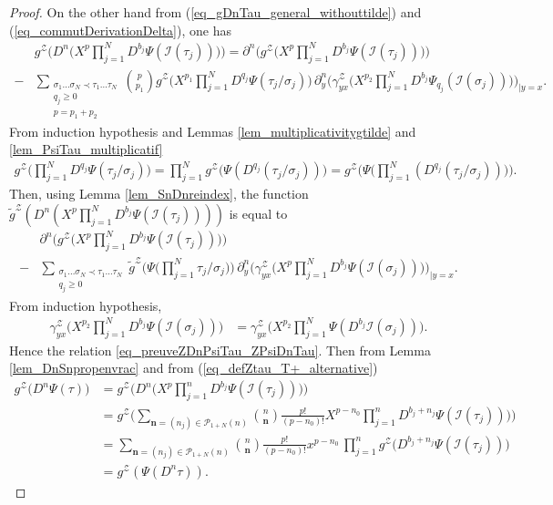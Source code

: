 \documentclass[11pt]{preprint}
\newcommand{\mcI}{\mathcal{I}}
\newcommand{\mcP}{\mathcal{P}}
\newcommand{\mcZ}{\mathcal{Z}}
\def\eqref#1{(\ref{#1})}
\begin{document}
\begin{proof}
On the other hand from \eqref{eq_gDnTau_general_withouttilde} and  \eqref{eq_commutDerivationDelta}, one has
\begin{align*}
&	{ g}^\mcZ \Big( D^n \Big( X^p \prod_{j=1}^{N} D^{b_j} \Psi( \mcI(\tau_j) )   \Big)    \Big) 
=  \partial^{n}\Big( {g}^\mcZ \Big(  X^p \prod_{j=1}^{N} D^{b_j} \Psi( \mcI(\tau_j) )   \Big) \Big)
	\\ -  &\sum_{\substack{\sigma_1\dots\sigma_N\prec\tau_1\dots\tau_N \\ q_j \geq 0 \\ p=p_1+p_2}} \binom{p}{p_1} { g}^\mcZ\Big(X^{p_1}\prod_{j=1}^{N} D^{q_j}\Psi(\tau_j/\sigma_j)\Big)
	\,
	 \partial^n_y \Big({\gamma^\mcZ_{yx}} \Big(X^{p_2}\prod_{j=1}^N D^{b_j}\Psi_{q_j}(\mcI(\sigma_j))\Big)\Big)_{|y=x}.
\end{align*}
From induction hypothesis and Lemmas \ref{lem_multiplicativitygtilde} and \ref{lem_PsiTau_multiplicatif}
\begin{align*}
	{ g}^\mcZ\Big(\prod_{j=1}^{N} D^{q_j}\Psi(\tau_j/\sigma_j)\Big) 
	=
	\prod_{j=1}^{N} { g}^\mcZ\Big( \Psi\left(D^{q_j}(\tau_j/\sigma_j)\right)\Big)
	 =
	  { g}^\mcZ\Big(\Psi\Big(\prod_{j=1}^{N} \left(D^{q_j}(\tau_j/\sigma_j)\right)\Big)\Big).
\end{align*}
Then, using Lemma \ref{lem_SnDnreindex}, the function $	\widetilde{ g}^\mcZ \left( D^n \left( X^p \prod_{j=1}^{N} D^{b_j} \Psi( \mcI(\tau_j) )   \right)    \right) $ is equal to 
\begin{align*}
	&\partial^{n}\Big( {g}^\mcZ \Big(  X^p \prod_{j=1}^{N} D^{b_j} \Psi( \mcI(\tau_j) )   \Big) \Big)
\\ -  &\sum_{\substack{\sigma_1\dots\sigma_N\prec\tau_1\dots\tau_N \\ q_j \geq 0 }} \widetilde{ g}^\mcZ\Big(\Psi\Big(\prod_{j=1}^{N} \tau_j/\sigma_j\Big)\Big)
\,
\partial^n_y \Big({\gamma^\mcZ_{yx}} \Big(X^{p}\prod_{j=1}^N D^{b_j}\Psi(\mcI(\sigma_j))\Big)\Big)_{|y=x}.
\end{align*}
From induction hypothesis,
\begin{align*}
	{\gamma_{yx}^\mcZ} \Big(X^{p_2}\prod_{j=1}^N D^{b_j}\Psi(\mcI(\sigma_j))\Big)
	&= {\gamma_{yx}^\mcZ} \Big(X^{p_2}\prod_{j=1}^N \Psi(D^{b_j}\mcI(\sigma_j))\Big).
\end{align*}
Hence the relation \ref{eq_preuveZDnPsiTau_ZPsiDnTau}. Then from Lemma \ref{lem_DnSnpropenvrac} and from \eqref{eq_defZtau_T+_alternative}
\begin{align*}
	  { g}^\mcZ\Big( D^n \Psi(\tau)    \Big)  
	  &=
	  { g}^\mcZ\Big( D^n \Big( X^p \prod_{j=1}^{n} D^{b_j} \Psi( \mcI(\tau_j) )   \Big)    \Big)  
	  \\&=
	   {g}^\mcZ\Big( \sum_{\bm n=(n_j) \in \mcP_{1+N}(n)} \binom{n}{\bm n} \frac{p !}{(p-n_0)!} X^{p-n_0} \prod_{j=1}^{n} D^{b_j+n_j} \Psi( \mcI(\tau_j) )   \Big)    \Big) 
	   \\&=
	   \sum_{\bm n=(n_j) \in \mcP_{1+N}(n)} \binom{n}{\bm n} \frac{p !}{(p-n_0)!} x^{p-n_0} \,  \prod_{j=1}^{n} { g}^\mcZ\Big( D^{b_j+n_j} \Psi( \mcI(\tau_j) )   \Big)    
	   \\&= 
	   { g}^\mcZ\left(\Psi(D^n\tau)\right) .
 \end{align*} 
\end{proof}
\end{document}
